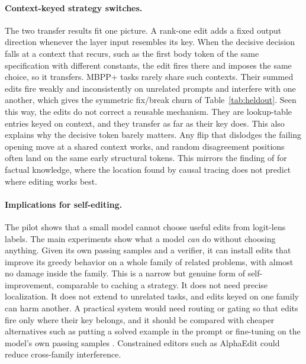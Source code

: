 \documentclass[11pt]{article}
\begin{document}
\paragraph{Context-keyed strategy switches.} The two transfer results fit one picture. A rank-one edit adds a fixed output direction whenever the layer input resembles its key. When the decisive decision falls at a context that recurs, such as the first body token of the same specification with different constants, the edit fires there and imposes the same choice, so it transfers. MBPP+ tasks rarely share such contexts. Their summed edits fire weakly and inconsistently on unrelated prompts and interfere with one another, which gives the symmetric fix/break churn of Table~\ref{tab:heldout}. Seen this way, the edits do not correct a reusable mechanism. They are lookup-table entries keyed on context, and they transfer as far as their key does. This also explains why the decisive token barely matters. Any flip that dislodges the failing opening move at a shared context works, and random disagreement positions often land on the same early structural tokens. This mirrors the finding of \citet{hase2023localization} for factual knowledge, where the location found by causal tracing does not predict where editing works best.

\paragraph{Implications for self-editing.} The pilot shows that a small model cannot choose useful edits from logit-lens labels. The main experiments show what a model \emph{can} do without choosing anything. Given its own passing samples and a verifier, it can install edits that improve its greedy behavior on a whole family of related problems, with almost no damage inside the family. This is a narrow but genuine form of self-improvement, comparable to caching a strategy. It does not need precise localization. It does not extend to unrelated tasks, and edits keyed on one family can harm another. A practical system would need routing or gating so that edits fire only where their key belongs, and it should be compared with cheaper alternatives such as putting a solved example in the prompt or fine-tuning on the model's own passing samples \citep{zweiger2025seal}. Constrained editors such as AlphaEdit \citep{fang2025alphaedit} could reduce cross-family interference.
\end{document}

